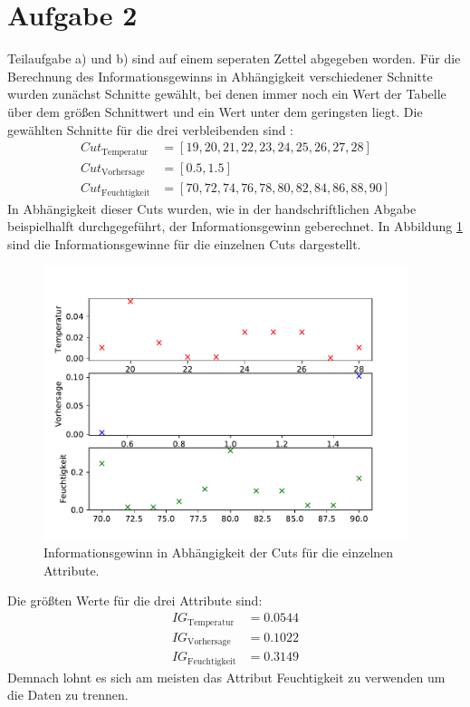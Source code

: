 \section{Aufgabe 2}
\label{sec:Aufgabe2}
% 
Teilaufgabe a) und b) sind auf einem seperaten Zettel abgegeben worden.
Für die Berechnung des Informationsgewinns in Abhängigkeit verschiedener
Schnitte wurden zunächst Schnitte gewählt, bei denen immer noch ein Wert der
Tabelle über dem größen Schnittwert und ein Wert unter dem geringsten liegt.
Die gewählten Schnitte für die drei verbleibenden sind :
\begin{align*}
  Cut_{\text{Temperatur}}&=[19, 20, 21, 22, 23, 24, 25, 26, 27, 28]\\
  Cut_{\text{Vorhersage}}&=[0.5, 1.5]\\
  Cut_{\text{Feuchtigkeit}}&=[70, 72, 74, 76, 78, 80, 82, 84, 86, 88, 90]
\end{align*}
In Abhängigkeit dieser Cuts wurden, wie in der handschriftlichen Abgabe beispielhalft
durchgegeführt, der Informationsgewinn geberechnet. In Abbildung \ref{fig:IG} sind
die Informationsgewinne für die einzelnen Cuts dargestellt.
\begin{figure}[h]
  \centering
  \includegraphics[height = 8cm]{plots/Informationsgewinn.pdf}
  \caption{Informationsgewinn in Abhängigkeit der Cuts für die einzelnen
           Attribute.}
  \label{fig:IG}
\end{figure}
Die größten Werte für die drei Attribute sind:
\begin{align*}
  IG_{\text{Temperatur}}&=0.0544\\
  IG_{\text{Vorhersage}}&=0.1022\\
  IG_{\text{Feuchtigkeit}}&=0.3149
\end{align*}
Demnach lohnt es sich am meisten das Attribut Feuchtigkeit zu verwenden um
die Daten zu trennen.
